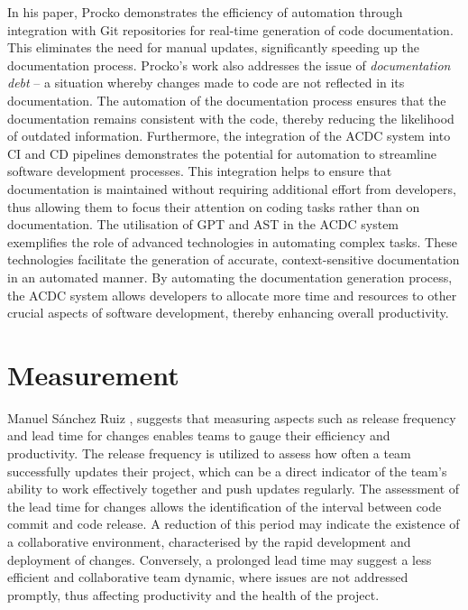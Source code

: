 In his paper, Procko \cite{Procko2024CodeDocumentation} demonstrates the efficiency of automation through integration with Git repositories for real-time generation of code documentation. This eliminates the need for manual updates, significantly speeding up the documentation process. Procko's work also addresses the issue of \textit{documentation debt} – a situation whereby changes made to code are not reflected in its documentation. The automation of the documentation process ensures that the documentation remains consistent with the code, thereby reducing the likelihood of outdated information. Furthermore, the integration of the \ac{ACDC} system into \ac{CI} and \ac{CD} pipelines demonstrates the potential for automation to streamline software development processes. This integration helps to ensure that documentation is maintained without requiring additional effort from developers, thus allowing them to focus their attention on coding tasks rather than on documentation. The utilisation of \ac{GPT} and \ac{AST} in the \ac{ACDC} system exemplifies the role of advanced technologies in automating complex tasks. These technologies facilitate the generation of accurate, context-sensitive documentation in an automated manner. By automating the documentation generation process, the \ac{ACDC} system allows developers to allocate more time and resources to other crucial aspects of software development, thereby enhancing overall productivity.
 

\section{Measurement}

Manuel Sánchez Ruiz \cite{Ruiz2023}, suggests that measuring aspects such as release frequency and lead time for changes enables teams to gauge their efficiency and productivity. The release frequency is utilized to assess how often a team successfully updates their project, which can be a direct indicator of the team’s ability to work effectively together and push updates regularly. The assessment of the lead time for changes allows the identification of the interval between code commit and code release. A reduction of this period may indicate the existence of a collaborative environment, characterised by the rapid development and deployment of changes. Conversely, a prolonged lead time may suggest a less efficient and collaborative team dynamic, where issues are not addressed promptly, thus affecting productivity and the health of the project.

